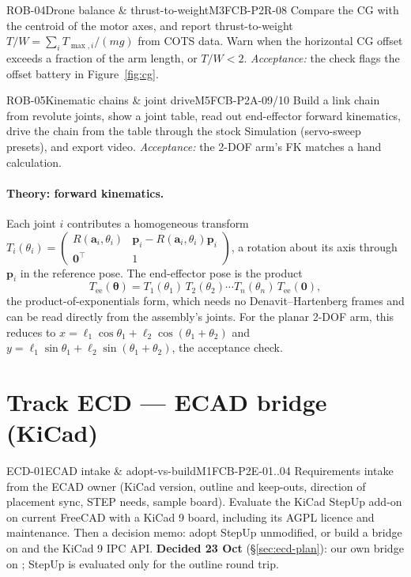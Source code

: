 \begin{epic}{ROB-04}{Drone balance \& thrust-to-weight}{M3}{\stDone}{FCB-P2R-08}
Compare the CG with the centroid of the motor axes, and report thrust-to-weight
$T/W=\sum_i T_{\max,i}/(m g)$ from COTS data. Warn when the horizontal CG offset exceeds a fraction of the
arm length, or $T/W<2$.
\emph{Acceptance:} the check flags the offset battery in Figure~\ref{fig:cg}.
\end{epic}

\begin{epic}{ROB-05}{Kinematic chains \& joint drive}{M5}{\stTodo}{FCB-P2A-09/10}
Build a link chain from revolute joints, show a joint table, read out end-effector forward kinematics, drive
the chain from the table through the stock Simulation (servo-sweep presets), and export video.
\emph{Acceptance:} the 2-DOF arm's FK matches a hand calculation.
\end{epic}

\paragraph{Theory: forward kinematics.} Each joint $i$ contributes a homogeneous transform
$T_i(\theta_i)=\begin{pmatrix}R(\mathbf a_i,\theta_i)&\mathbf p_i-R(\mathbf a_i,\theta_i)\mathbf p_i\\
\mathbf 0^{\!\top}&1\end{pmatrix}$, a rotation about its axis through $\mathbf p_i$ in the reference pose.
The end-effector pose is the product
\[
  T_{\text{ee}}(\boldsymbol\theta)=T_1(\theta_1)\,T_2(\theta_2)\cdots T_n(\theta_n)\,T_{\text{ee}}(\mathbf 0),
\]
the product-of-exponentials form, which needs no Denavit--Hartenberg frames and can be read directly from the
assembly's joints. For the planar 2-DOF arm, this reduces to
$x=\ell_1\cos\theta_1+\ell_2\cos(\theta_1+\theta_2)$ and $y=\ell_1\sin\theta_1+\ell_2\sin(\theta_1+\theta_2)$,
the acceptance check.

\section{Track ECD --- ECAD bridge (KiCad)}\label{sec:ecd}

\begin{epic}{ECD-01}{ECAD intake \& adopt-vs-build}{M1}{\stDone}{FCB-P2E-01..04}
Requirements intake from the ECAD owner (KiCad version, outline and keep-outs, direction of placement sync,
STEP needs, sample board). Evaluate the KiCad StepUp add-on on current FreeCAD with a KiCad 9 board,
including its AGPL licence and maintenance. Then a decision memo: adopt StepUp unmodified, or build a bridge on
 and the KiCad 9 IPC API. \textbf{Decided 23 Oct} (\S\ref{sec:ecd-plan}): our own bridge on
; StepUp is evaluated only for the outline round trip.
\end{epic}

